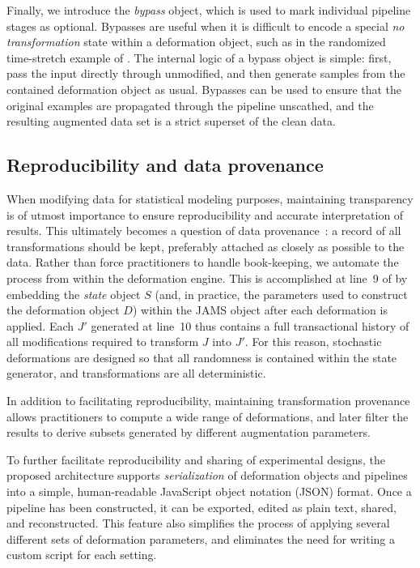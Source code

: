\documentclass{article}
\begin{document}
Finally, we introduce the \emph{bypass} object, which is used to mark
individual pipeline stages as optional.
Bypasses are useful when it is difficult to encode a special \emph{no transformation}
state within a deformation object, such as in the randomized time-stretch 
example of .
The internal logic of a bypass object is simple: first, pass the input directly through
unmodified, and then generate samples from the contained deformation object as usual.
Bypasses can be used to ensure that the original examples are propagated through the
pipeline unscathed, and the resulting augmented data set is a strict superset of the
clean data.

\subsection{Reproducibility and data provenance}
\label{sec:reproducibility}
When modifying data for statistical modeling purposes, maintaining transparency is of
utmost importance to ensure reproducibility and accurate interpretation of results.
This ultimately becomes a question of data provenance~\cite{buneman2000data}: a record of
all transformations should be kept, preferably attached as closely as possible to the data.
Rather than force practitioners to handle book-keeping, we automate the process from within
the deformation engine.
This is accomplished at line~9 of  by embedding the
\emph{state} object $S$ (and, in practice, the parameters used to construct the
deformation object $D$) within the JAMS object after each deformation is applied.
Each $J'$ generated at line~10 thus contains a full transactional history of all
modifications required to transform $J$ into $J'$.
For this reason, stochastic deformations are designed so that all randomness is contained
within the state generator, and transformations are all deterministic.

In addition to facilitating reproducibility, maintaining transformation provenance allows
practitioners to compute a wide range of deformations, and later filter the
results to derive subsets generated by different augmentation parameters.

To further facilitate reproducibility and sharing of experimental designs, the proposed
architecture supports \emph{serialization} of deformation objects and pipelines into a 
simple, human-readable JavaScript object notation (JSON) format.
Once a pipeline has been constructed, it can be exported, edited as plain text, shared,
and reconstructed.  This feature also simplifies the
process of applying several different sets of deformation parameters, and eliminates the
need for writing a custom script for each setting.
\end{document}
